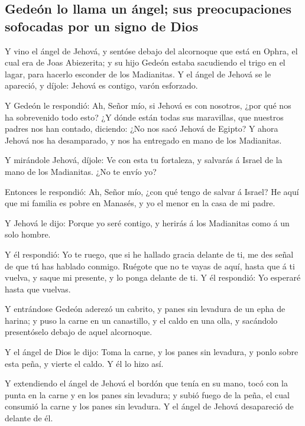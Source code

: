 \hypertarget{gedeuxf3n-lo-llama-un-uxe1ngel-sus-preocupaciones-sofocadas-por-un-signo-de-dios}{%
\subsection{Gedeón lo llama un ángel; sus preocupaciones sofocadas por
un signo de
Dios}\label{gedeuxf3n-lo-llama-un-uxe1ngel-sus-preocupaciones-sofocadas-por-un-signo-de-dios}}

 Y vino el ángel de Jehová, y sentóse debajo del alcornoque
que está en Ophra, el cual era de Joas Abiezerita; y su hijo Gedeón
estaba sacudiendo el trigo en el lagar, para hacerlo esconder de los
Madianitas.  Y el ángel de Jehová se le apareció, y díjole:
Jehová es contigo, varón esforzado.

 Y Gedeón le respondió: Ah, Señor mío, si Jehová es con
nosotros, ¿por qué nos ha sobrevenido todo esto? ¿Y dónde están todas
sus maravillas, que nuestros padres nos han contado, diciendo: ¿No nos
sacó Jehová de Egipto? Y ahora Jehová nos ha desamparado, y nos ha
entregado en mano de los Madianitas.

 Y mirándole Jehová, díjole: Ve con esta tu fortaleza, y
salvarás á Israel de la mano de los Madianitas. ¿No te envío yo?

 Entonces le respondió: Ah, Señor mío, ¿con qué tengo de
salvar á Israel? He aquí que mi familia es pobre en Manasés, y yo el
menor en la casa de mi padre.

 Y Jehová le dijo: Porque yo seré contigo, y herirás á los
Madianitas como á un solo hombre.

 Y él respondió: Yo te ruego, que si he hallado gracia
delante de ti, me des señal de que tú has hablado conmigo. 
Ruégote que no te vayas de aquí, hasta que á ti vuelva, y saque mi
presente, y lo ponga delante de ti. Y él respondió: Yo esperaré hasta
que vuelvas.

 Y entrándose Gedeón aderezó un cabrito, y panes sin
levadura de un epha de harina; y puso la carne en un canastillo, y el
caldo en una olla, y sacándolo presentóselo debajo de aquel alcornoque.

 Y el ángel de Dios le dijo: Toma la carne, y los panes sin
levadura, y ponlo sobre esta peña, y vierte el caldo. Y él lo hizo así.

 Y extendiendo el ángel de Jehová el bordón que tenía en su
mano, tocó con la punta en la carne y en los panes sin levadura; y subió
fuego de la peña, el cual consumió la carne y los panes sin levadura. Y
el ángel de Jehová desapareció de delante de él.

